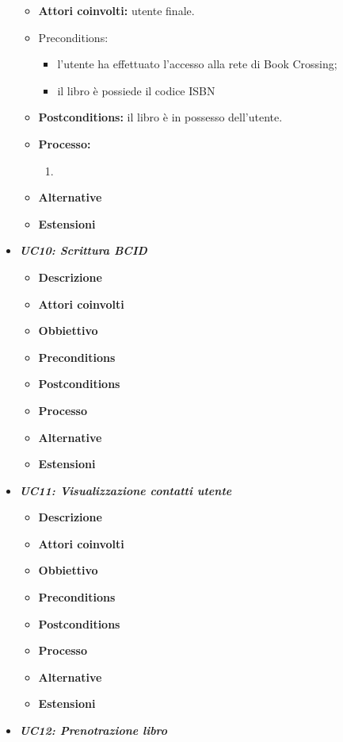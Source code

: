 \begin{itemize}
\begin{itemize}
		\item \textbf{Attori coinvolti:} utente finale.
		\item {Preconditions:} 
		\begin{itemize}
			\item l’utente ha effettuato l’accesso alla rete di Book Crossing;
			\item il libro è possiede il codice ISBN
		\end{itemize}
		\item \textbf{Postconditions:} il libro è in possesso dell'utente.
		\item \textbf{Processo:}
		\begin{enumerate}
			\item 
		\end{enumerate}
		\item \textbf{Alternative}
		\item \textbf{Estensioni}
	\end{itemize}
	\item \textbf{\textit{UC10: Scrittura BCID}}
	\begin{itemize}
		\item \textbf{Descrizione}
		\item \textbf{Attori coinvolti}
		\item \textbf{Obbiettivo}
		\item \textbf{Preconditions}
		\item \textbf{Postconditions}
		\item \textbf{Processo}
		\item \textbf{Alternative}
		\item \textbf{Estensioni}
	\end{itemize}
	\item \textbf{\textit{UC11: Visualizzazione contatti utente}}
	\begin{itemize}
		\item \textbf{Descrizione}
		\item \textbf{Attori coinvolti}
		\item \textbf{Obbiettivo}
		\item \textbf{Preconditions}
		\item \textbf{Postconditions}
		\item \textbf{Processo}
		\item \textbf{Alternative}
		\item \textbf{Estensioni}
	\end{itemize}
	\item \textbf{\textit{UC12: Prenotrazione libro}}

\end{itemize}
